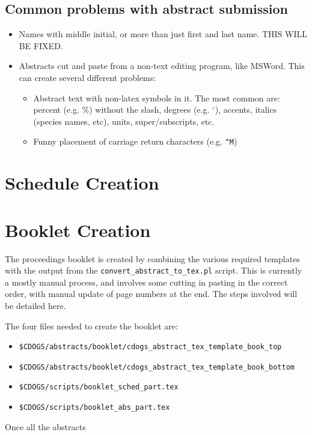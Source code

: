 \documentclass[letterpaper,12pt]{article}
\begin{document}
\subsection{Common problems with abstract submission}

\begin{itemize}
\item Names with middle initial, or more than just first and last
  name. THIS WILL BE FIXED.
\item Abstracts cut and paste from a non-text editing program, like
  MSWord. This can create several different problems:
  \begin{itemize}
  \item Abstract text with non-latex symbols in it. The most common
    are: percent (e.g. $\%$) without the slash, degrees
    (e.g. $^{\circ}$), accents, italics (species names, etc), units,
    super/subscripts, etc.
  \item Funny placement of carriage return characters (e.g. \verb|^M|)
  \end{itemize}

\end{itemize}

\section{Schedule Creation}

\section{Booklet Creation}

The proceedings booklet is created by combining the various required
templates with the output from the \verb|convert_abstract_to_tex.pl|
script. This is currently a mostly manual process, and involves some
cutting in pasting in the correct order, with manual update of page
numbers at the end. The steps involved will be detailed here.

The four files needed to create the booklet are:
\begin{itemize}
\item \verb|$CDOGS/abstracts/booklet/cdogs_abstract_tex_template_book_top|
\item \verb|$CDOGS/abstracts/booklet/cdogs_abstract_tex_template_book_bottom|
\item \verb|$CDOGS/scripts/booklet_sched_part.tex|
\item \verb|$CDOGS/scripts/booklet_abs_part.tex|
\end{itemize}

Once all the abstracts
\end{document}
